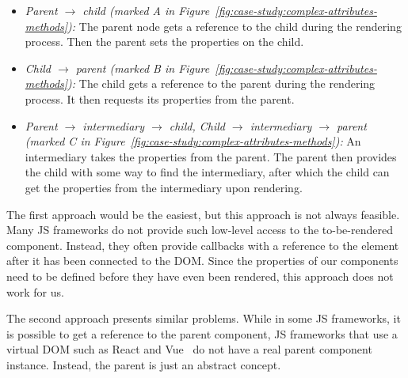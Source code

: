 {  \begin{itemize}
    \item \emph{Parent \(\rightarrow\) child (marked A in Figure~\ref{fig:case-study:complex-attributes-methods}):} The parent node gets a reference to the child during the rendering process. Then the parent sets the properties on the child.
    \item \emph{Child \(\rightarrow\) parent (marked B in Figure~\ref{fig:case-study:complex-attributes-methods}):} The child gets a reference to the parent during the rendering process. It then requests its properties from the parent.
    \item \emph{Parent \(\rightarrow\) intermediary \(\rightarrow\) child, Child \(\rightarrow\) intermediary \(\rightarrow\) parent (marked C in Figure~\ref{fig:case-study:complex-attributes-methods}):} An intermediary takes the properties from the parent. The parent then provides the child with some way to find the intermediary, after which the child can get the properties from the intermediary upon rendering.
  \end{itemize}

  The first approach would be the easiest, but this approach is not always feasible. Many JS frameworks do not provide such low-level access to the to-be-rendered component. Instead, they often provide callbacks with a reference to the element after it has been connected to the DOM\@. Since the properties of our components need to be defined before they have even been rendered, this approach does not work for us.

  The second approach presents similar problems. While in some JS frameworks, it is possible to get a reference to the parent component, JS frameworks that use a virtual DOM such as React and Vue~ do not have a real parent component instance. Instead, the parent is just an abstract concept.

}
